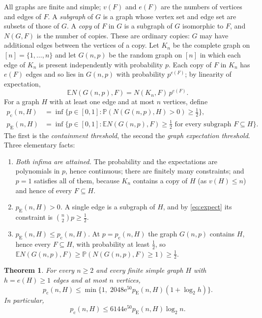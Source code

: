 \documentclass[11pt]{article}
\newtheorem{theorem}{Theorem}[section]
\numberwithin{equation}{section}
\newcommand{\PP}{\mathbb P}
\newcommand{\EE}{\mathbb E}
\newcommand{\pc}{p_{\mathrm c}}
\newcommand{\pE}{p_{\mathrm E}}
\newcommand{\ee}{\mathrm e}
\begin{document}
All graphs are finite and simple; $v(F)$ and $e(F)$ are the numbers of
vertices and edges of $F$. A \emph{subgraph} of $G$ is a graph whose
vertex set and edge set are subsets of those of $G$. A \emph{copy} of $F$
in $G$ is a subgraph of $G$ isomorphic to $F$, and $N(G,F)$ is the number
of copies. These are ordinary copies: $G$ may have additional edges
between the vertices of a copy. Let $K_n$ be the complete graph on
$[n]=\{1,\ldots,n\}$ and let $G(n,p)$ be the random graph on $[n]$ in
which each edge of $K_n$ is present independently with probability $p$.
Each copy of $F$ in $K_n$ has $e(F)$ edges and so lies in $G(n,p)$ with
probability $p^{e(F)}$; by linearity of expectation,
\begin{equation}\label{eq:expect}
 \EE N(G(n,p),F)=N(K_n,F)\,p^{e(F)}.
\end{equation}
For a graph $H$ with at least one edge and at most $n$ vertices, define
\begin{align*}
 \pc(n,H)
 &=\inf\{p\in[0,1]:\PP(N(G(n,p),H)>0)\ge\tfrac12\},\\
 \pE(n,H)
 &=\inf\{p\in[0,1]:\EE N(G(n,p),F)\ge\tfrac12
                 \text{ for every subgraph }F\subseteq H\}.
\end{align*}
The first is the \emph{containment threshold}, the second the
\emph{graph expectation threshold}. Three elementary facts:
\begin{enumerate}[label=(\alph*),leftmargin=2.2em,itemsep=2pt]
 \item \emph{Both infima are attained.} The probability and the
 expectations are polynomials in $p$, hence continuous; there are
 finitely many constraints; and $p=1$ satisfies all of them, because
 $K_n$ contains a copy of $H$ (as $v(H)\le n$) and hence of every
 $F\subseteq H$.
 \item \emph{$\pE(n,H)>0$.} A single edge is a subgraph of $H$, and by
 \eqref{eq:expect} its constraint is $\binom n2p\ge\frac12$.
 \item \emph{$\pE(n,H)\le\pc(n,H)$.} At $p=\pc(n,H)$ the graph $G(n,p)$
 contains $H$, hence every $F\subseteq H$, with probability at least
 $\frac12$, so $\EE N(G(n,p),F)\ge\PP(N(G(n,p),F)\ge1)\ge\frac12$.
\end{enumerate}

\begin{theorem}\label{thm:main}
For every $n\ge2$ and every finite simple graph $H$ with $h=e(H)\ge1$
edges and at most $n$ vertices,
\begin{equation}\label{eq:stronger}
 \pc(n,H)\le
 \min\{1,\;2048\ee^{50}\pE(n,H)(1+\log_2 h)\}.
\end{equation}
In particular,
\[
 \pc(n,H)\le6144\ee^{50}\pE(n,H)\log_2 n.
\]
\end{theorem}
\end{document}
